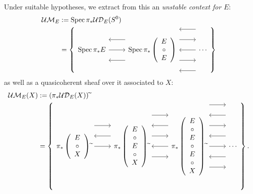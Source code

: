 \begin{definition}
Under suitable hypotheses, we extract from this an \textit{unstable context for $E$}:
\begin{align*}
\mathcal{UM}_E & := \Spec \pi_* \sheaf{UD}_E(S^0) \\
& = \left\{
\begin{tikzcd}[ampersand replacement=\&]
\Spec \pi_* E \arrow{r} \arrow[leftarrow,shift left=\baselineskip]{r}
\arrow[leftarrow,shift right=\baselineskip]{r}
\&
\Spec \pi_* \left( \begin{array}{c} E \\ \circ \\ E \end{array} \right)
\arrow[leftarrow, shift left=(2*\baselineskip)]{r} \arrow[shift left=\baselineskip]{r} \arrow[leftarrow]{r} \arrow[shift right=\baselineskip]{r} \arrow[leftarrow, shift right=(2*\baselineskip)]{r}
\&
\cdots
\end{tikzcd}
\right\}
\end{align*}
as well as a quasicoherent sheaf over it associated to $X$:
\begin{align*}
\sheaf{UM}_E(X) & := \left(\pi_* \sheaf{UD}_E(X)\right){\widetilde{}} \\
& = \left\{
\begin{tikzcd}[ampersand replacement=\&]
\pi_* \left( \begin{array}{c} E \\ \circ \\ X \end{array} \right)\widetilde{} \arrow[leftarrow, shift left=\baselineskip]{r} \arrow[shift left=(2*\baselineskip)]{r} \arrow{r} \&
\pi_* \left( \begin{array}{c} E \\ \circ \\ E \\ \circ \\ X \end{array} \right)\widetilde{} \arrow[shift left=(3*\baselineskip)]{r} \arrow[leftarrow, shift left=(2*\baselineskip)]{r} \arrow[shift left=\baselineskip]{r} \arrow[leftarrow]{r} \arrow[shift right=\baselineskip]{r} \&
\pi_* \left( \begin{array}{c} E \\ \circ \\ E \\ \circ \\ E \\ \circ \\ X \end{array} \right)\widetilde{} \arrow[shift left=(4*\baselineskip)]{r} \arrow[leftarrow, shift left=(3*\baselineskip)]{r} \arrow[shift left=(2*\baselineskip)]{r} \arrow[leftarrow, shift left=\baselineskip]{r} \arrow{r} \arrow[leftarrow, shift right=\baselineskip]{r} \arrow[shift right=(2*\baselineskip)]{r} \&
\cdots
\end{tikzcd}
\right\}.
\end{align*}
\end{definition}

